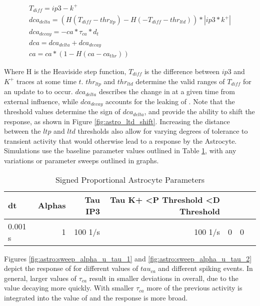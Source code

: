 \begin{align}
  T_{diff} = ip3 - k^+ \\
  dca_{delta} = (H(T_{diff} - thr_{ltp}) - H(-T_{diff} - thr_{ltd})) * |ip3*k^+| \\
  dca_{decay} = -ca * \tau_{ca} * d_t \\
  dca = dca_{delta} + dca_{decay} \label{eq:astro:rate-u} \\
  ca = ca * (1 - H(ca - ca_{thr})) \label{eq:astro:u-reset}
\end{align}

Where H is the Heaviside step function, $T_{diff}$ is the difference between
$ip3$ and $K^+$ traces at some time $t$. $thr_{ltp}$ and $thr_{ltd}$ determine
the valid ranges of $T_{diff}$ for an update to \ca to occur. $dca_{delta}$
describes the change in \ca at a given time from external influence, while
$dca_{decay}$ accounts for the leaking of \ca. Note that the threshold values
determine the sign of $dca_{delta}$, and provide the ability to shift the \ca
response, as shown in Figure \ref{fig:astro_ltd_shift}. Increasing the distance
between the $ltp$ and $ltd$ thresholds also allow for varying degrees of
tolerance to transient activity that would otherwise lead to a response by the
Astrocyte. Simulations use the baseline parameter values outlined in Table
\ref{table:ordered_prop_params}, with any variations or parameter sweeps
outlined in graphs.

\begin{table}[!htp]\centering
  \caption{Signed Proportional Astrocyte Parameters} \label{table:ordered_prop_params}
  \scriptsize
  \begin{tabular}{lrrrrrr}\toprule
    dt &Alphas &Tau IP3 &Tau K+ <P Threshold <D Threshold \\\midrule
    0.001 s &1 &100 1/s &100 1/s &0 &0 \\
    \bottomrule
  \end{tabular}
\end{table}



Figures \ref{fig:astro:sweep_alpha_u_tau_1} and
\ref{fig:astro:sweep_alpha_u_tau_2} depict the response of \ca for
different values of $tau_{ca}$ and different spiking events. In general,
larger values of $\tau_{ca}$ result in smaller deviations in \ca overall, due
to the value decaying more quickly. With smaller $\tau_{ca}$ more of the
previous activity is integrated into the value of \ca and the response is
more broad.

